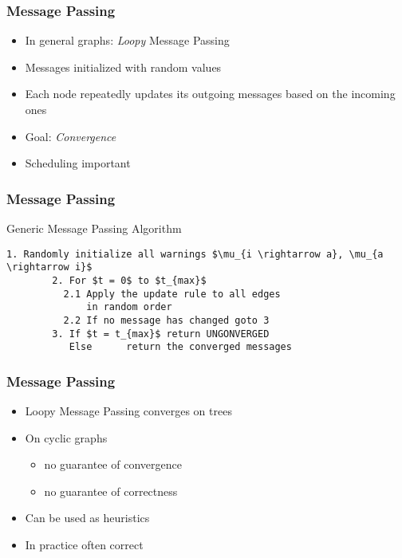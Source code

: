 \begin{frame}
	\frametitle{Message Passing}
	\begin{itemize}
		\item In general graphs: \emph{Loopy} Message Passing
		\item Messages initialized with random values
		\item Each node repeatedly updates its outgoing messages based on the incoming ones
		\item Goal: \emph{Convergence}
		\item Scheduling important
	\end{itemize}

		
\end{frame}

\begin{frame}[containsverbatim]
	\frametitle{Message Passing}
	Generic Message Passing Algorithm
	\begin{lstlisting}[mathescape = true, gobble=15, basicstyle=\ttfamily]
		1. Randomly initialize all warnings $\mu_{i \rightarrow a}, \mu_{a \rightarrow i}$
		2. For $t = 0$ to $t_{max}$
		  2.1 Apply the update rule to all edges
		      in random order
		  2.2 If no message has changed goto 3
		3. If $t = t_{max}$ return UNGONVERGED
		   Else      return the converged messages
	\end{lstlisting}
\end{frame}

\begin{frame}
	\frametitle{Message Passing}
	\begin{itemize}
		\item Loopy Message Passing converges on trees
		\item On cyclic graphs
			\begin{itemize}
				\item no guarantee of convergence
				\item no guarantee of correctness
			\end{itemize}
		\item Can be used as heuristics
		\item In practice often correct
			\end{itemize}
\end{frame}
